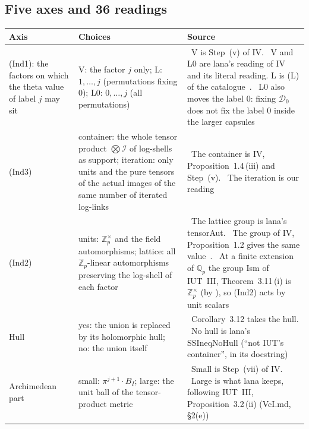 \documentclass[11pt,a4paper]{article}
\newcommand{\Q}{\mathbb{Q}}
\newcommand{\Zp}{\mathbb{Z}_p}
\newcommand{\I}{\mathcal{I}}
\newcommand{\leanus}{\textunderscore\allowbreak}
\newcommand{\lean}[1]{{\ttfamily\let\_\leanus #1}}
\newcommand{\lab}[2]{{\upshape\fcolorbox{#1}{#1!8}{\scriptsize\sffamily\bfseries\textcolor{#1}{#2}}}}
\newcommand{\tagS}{\lab{blue}{S}}
\newcommand{\tagX}{\lab{Purple}{X}}
\newcommand{\tagP}{\lab{ForestGreen}{P}}
\newcommand{\tagH}{\lab{BurntOrange}{H}}
\theoremstyle{plain}
\theoremstyle{definition}
\theoremstyle{remark}
\begin{document}
\subsection{Five axes and 36 readings}\label{ss:axes}
\begin{center}\small
\begin{tabular}{@{}>{\raggedright\arraybackslash}p{2.9cm}>{\raggedright\arraybackslash}p{6.1cm}>{\raggedright\arraybackslash}p{5.9cm}@{}}
\toprule
Axis & Choices & Source\\
\midrule
(Ind1): the factors on which the theta value of label $j$ may sit &
V: the factor $j$ only; L: $1,\dots,j$ (permutations fixing $0$); L0: $0,\dots,j$ (all permutations) &
\tagS\ V is Step~(v) of IV. \tagX\ V and L0 are lana's reading of IV and its literal reading. L is (L) of the
catalogue~\cite{Cat}. \tagP\ L0 also moves the label $0$: fixing $\mathcal D_0$ does not fix the label $0$ inside the
larger capsules~\cite[\S6]{Fourth}\\
\addlinespace
(Ind3) &
container: the whole tensor product $\bigotimes\I$ of log-shells as support; iteration: only units and the pure
tensors of the actual images of the same number of iterated log-links &
\tagS\ The container is IV, Proposition~1.4\,(iii) and Step~(v). \tagH\ The iteration is our reading\\
\addlinespace
(Ind2) &
units: $\Zp^\times$ and the field automorphisms; lattice: all $\Zp$-linear automorphisms preserving the log-shell of
each factor &
\tagX\ The lattice group is lana's \lean{tensorAut}. \tagP\ The group of IV, Proposition~1.2 gives the same
value~\cite[\S6.2]{Gap}. \tagP\ At a finite extension of $\Q_p$ the group Ism of IUT~III, Theorem~3.11\,(i) is
$\Zp^\times$ (by \cite[Thm.~F, Thm.~7.4]{MT}), so (Ind2) acts by unit scalars~\cite[\S6, Proposition~9]{Fourth}\\
\addlinespace
Hull &
yes: the union is replaced by its holomorphic hull; no: the union itself &
\tagS\ Corollary~3.12 takes the hull. \tagX\ No hull is lana's \lean{SSIneqNoHull} (``not IUT's container'', in its
docstring)\\
\addlinespace
Archimedean part &
small: $\pi^{j+1}\cdot B_I$; large: the unit ball of the tensor-product metric &
\tagS\ Small is Step~(vii) of IV. \tagX\ Large is what lana keeps, following IUT~III, Proposition~3.2\,(ii)
(\lean{VcI.md}, \S2(e))\\
\bottomrule
\end{tabular}
\end{center}
\end{document}
